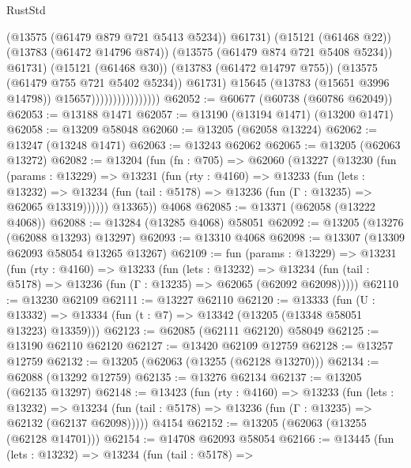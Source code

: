 \begin{lexlean}{RustStd}
\begin{coremodule}
                                          (@13575 (@61479 @879 @721 @5413 @5234))
                                          @61731)
                                        (@15121 (@61468 @22))
                                        (@13783 (@61472 @14796 @874))
                                        (@13575 (@61479 @874 @721 @5408 @5234))
                                        @61731)
                                      (@15121 (@61468 @30))
                                      (@13783 (@61472 @14797 @755))
                                      (@13575 (@61479 @755 @721 @5402 @5234))
                                      @61731)
                                    @15645
                                    (@13783 (@15651 @3996 @14798))
                                    @15657))))))))))))))))
@62052 := @60677 (@60738 (@60786 @62049))
@62053 := @13188 @1471
@62057 := @13190 (@13194 @1471) (@13200 @1471)
@62058 := @13209 @58048
@62060 := @13205 (@62058 @13224)
@62062 := @13247 (@13248 @1471)
@62063 := @13243 @62062
@62065 := @13205 (@62063 @13272)
@62082 := @13204
    (fun (fn : @705) =>
    @62060
      (@13227
        (@13230
          (fun (params : @13229) =>
          @13231
            (fun (rty : @4160) =>
            @13233
              (fun (lets : @13232) =>
              @13234 (fun (tail : @5178) => @13236 (fun (Γ : @13235) => @62065 @13319))))))
        @13365))
    @4068
@62085 := @13371 (@62058 (@13222 @4068))
@62088 := @13284 (@13285 @4068) @58051
@62092 := @13205 (@13276 (@62088 @13293) @13297)
@62093 := @13310 @4068
@62098 := @13307 (@13309 @62093 @58054 @13265 @13267)
@62109 := fun (params : @13229) =>
  @13231
    (fun (rty : @4160) =>
    @13233
      (fun (lets : @13232) =>
      @13234 (fun (tail : @5178) => @13236 (fun (Γ : @13235) => @62065 (@62092 @62098)))))
@62110 := @13230 @62109
@62111 := @13227 @62110
@62120 := @13333
    (fun (U : @13332) => @13334 (fun (t : @7) => @13342 (@13205 (@13348 @58051 @13223) @13359)))
@62123 := @62085 (@62111 @62120) @58049
@62125 := @13190 @62110 @62120
@62127 := @13420 @62109 @12759
@62128 := @13257 @12759
@62132 := @13205 (@62063 (@13255 (@62128 @13270)))
@62134 := @62088 (@13292 @12759)
@62135 := @13276 @62134
@62137 := @13205 (@62135 @13297)
@62148 := @13423
    (fun (rty : @4160) =>
    @13233
      (fun (lets : @13232) =>
      @13234 (fun (tail : @5178) => @13236 (fun (Γ : @13235) => @62132 (@62137 @62098)))))
    @4154
@62152 := @13205 (@62063 (@13255 (@62128 @14701)))
@62154 := @14708 @62093 @58054
@62166 := @13445
    (fun (lets : @13232) =>
    @13234
      (fun (tail : @5178) =>

\end{coremodule}
\end{lexlean}
